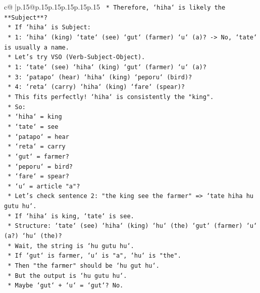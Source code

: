 \documentclass{article}
\begin{document}
{\begin{supertabular}{c@{$\;$}|p{.15\linewidth}@{}p{.15\linewidth}p{.15\linewidth}p{.15\linewidth}p{.15\linewidth}p{.15\linewidth}}
{{{\texttt{        *   Therefore, `hiha` is likely the **Subject**?} \\
\texttt{        *   If `hiha` is Subject:} \\
\texttt{            *   1: `hiha` (king) `tate` (see) `gut` (farmer) `u` (a)? {-}> No, `tate` is usually a name.} \\
\texttt{        *   Let's try VSO (Verb{-}Subject{-}Object).} \\
\texttt{            *   1: `tate` (see) `hiha` (king) `gut` (farmer) `u` (a)?} \\
\texttt{            *   3: `patapo` (hear) `hiha` (king) `peporu` (bird)?} \\
\texttt{            *   4: `reta` (carry) `hiha` (king) `fare` (spear)?} \\
\texttt{            *   This fits perfectly! `hiha` is consistently the "king".} \\
\texttt{            *   So:} \\
\texttt{                *   `hiha` = king} \\
\texttt{                *   `tate` = see} \\
\texttt{                *   `patapo` = hear} \\
\texttt{                *   `reta` = carry} \\
\texttt{                *   `gut` = farmer?} \\
\texttt{                *   `peporu` = bird?} \\
\texttt{                *   `fare` = spear?} \\
\texttt{                *   `u` = article "a"?} \\
\texttt{            *   Let's check sentence 2: "the king see the farmer" => `tate hiha hu gutu hu`.} \\
\texttt{            *   If `hiha` is king, `tate` is see.} \\
\texttt{            *   Structure: `tate` (see) `hiha` (king) `hu` (the) `gut` (farmer) `u` (a?) `hu` (the)?} \\
\texttt{            *   Wait, the string is `hu gutu hu`.} \\
\texttt{            *   If `gut` is farmer, `u` is "a", `hu` is "the".} \\
\texttt{            *   Then "the farmer" should be `hu gut hu`.} \\
\texttt{            *   But the output is `hu gutu hu`.} \\
\texttt{            *   Maybe `gut` + `u` = `gut`? No.} \\
}}}
\end{supertabular}}
\end{document}
